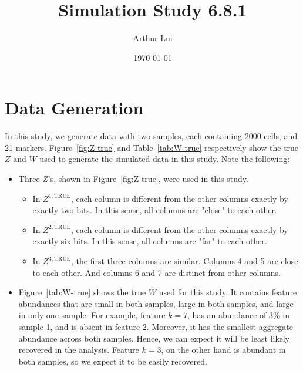 \documentclass[10pt]{article} %
\title{Simulation Study 6.8.1}
\author{Arthur Lui}
\date{\today} %
\def\true{\text{TRUE}}
\begin{document}
\maketitle



\section{Data Generation}\label{sec:data-generation}
In this study, we generate data with two samples, each containing 2000 cells,
and 21 markers. Figure~\ref{fig:Z-true} and Table~\ref{tab:W-true}
respectively show the true $Z$ and $W$ used to generate the simulated data in
this study. Note the following:
\begin{itemize}
  \item Three $Z$'s, shown in Figure~\ref{fig:Z-true}, were used in this study.
  \begin{itemize}
    \item In $Z^{1,\true}$, each column is different from the other columns exactly
    by exactly two bits. In this sense, all columns are "close" to each
    other.
    \item In $Z^{2,\true}$, each column is different from the other columns exactly
    by exactly six bits. In this sense, all columns are "far" to each
    other.
    \item In $Z^{3,\true}$, the first three columns are similar. Columns 4 and 5 are 
    close to each other. And columns 6 and 7 are distinct from other columns. 
  \end{itemize}
  \item Figure~\ref{tab:W-true} shows the true $W$ used for this study. It
    contains feature abundances that are small in both samples, large in both
    samples, and large in only one sample. For example, feature $k=7$, 
    has an abundance of $3\%$ in sample 1, and is absent in feature 2. 
    Moreover, it has the smallest aggregate abundance across both samples. 
    Hence, we can expect it will be least likely recovered in the analysis. 
    Feature $k=3$, on the other hand is abundant in both samples, so we expect
    it to be easily recovered.
\end{itemize}
\end{document}
